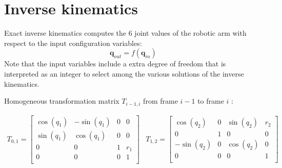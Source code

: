 \documentclass{article}
\newcommand\conf{\mathbf{q}}
\begin{document}
\section{Inverse kinematics}

Exact inverse kinematics computes the 6 joint values of the robotic arm with
respect to the input configuration variables:
\begin{equation}\label{eq:inverse-kinematics}
  \conf_{out} = f(\conf_{in})
\end{equation}
Note that the input variables include a extra degree of freedom that is interpreted as an integer to select among the various solutions of the inverse kinematics.



Homogeneous transformation matrix  $T_{i-1,i}$  from frame $i-1$  to frame $i$  :

\[
\begin{array}{cc}
T_{0,1} =
\begin{bmatrix}
  \cos(q_1) & -\sin(q_1) & 0 & 0 \\
  \sin(q_1) & \cos(q_1) & 0 & 0 \\
  0 & 0 & 1 & r_1 \\
  0 & 0 & 0 & 1 \\

\end{bmatrix}

&

T_{1,2} =
\begin{bmatrix}
  \cos(q_2) & 0 & \sin(q_2) & r_2 \\
  0 & 1 & 0 & 0 \\
  -\sin(q_2) & 0 & \cos(q_2) & 0 \\
  0 & 0 & 0 & 1 \\

\end{bmatrix}
\end{array}
\]
\end{document}
